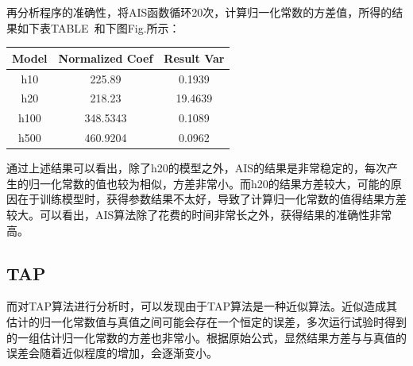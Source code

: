 \documentclass[journal,a4paper]{IEEEtran}
\begin{document}
		再分析程序的准确性，将AIS函数循环20次，计算归一化常数的方差值，所得的结果如下表TABLE~和下图Fig.所示：
		\begin{center}
		\begin{tabular}{c|cc}
			\hline
			Model & Normalized Coef& Result Var \\
			\hline
			h10 & 225.89 & 0.1939 \\
			h20 & 218.23 & 19.4639 \\
			h100 & 348.5343 & 0.1089 \\
			h500 & 460.9204 & 0.0962\\
			\hline
		\end{tabular}
		\end{center}
		通过上述结果可以看出，除了h20的模型之外，AIS的结果是非常稳定的，每次产生的归一化常数的值也较为相似，方差非常小。而h20的结果方差较大，可能的原因在于训练模型时，获得参数结果不太好，导致了计算归一化常数的值得结果方差较大。可以看出，AIS算法除了花费的时间非常长之外，获得结果的准确性非常高。

	\subsection{TAP}
		而对TAP算法进行分析时，可以发现由于TAP算法是一种近似算法。近似造成其估计的归一化常数值与真值之间可能会存在一个恒定的误差，多次运行试验时得到的一组估计归一化常数的方差也非常小。根据原始公式，显然结果方差与与真值的误差会随着近似程度的增加，会逐渐变小。
		
\end{document}
